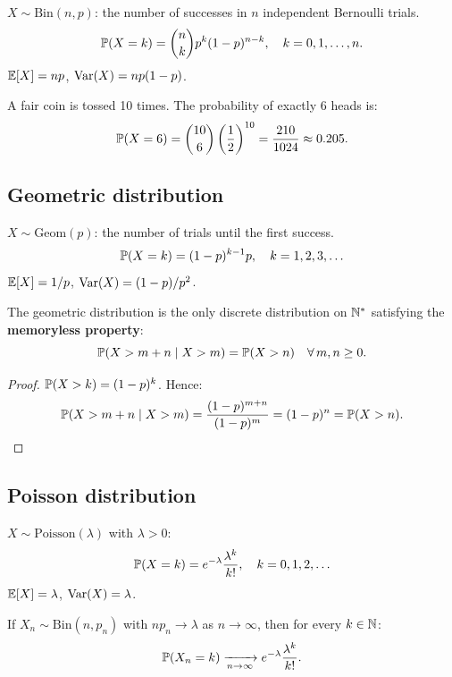 \begin{definition}[Binomial]
$X \sim \mathrm{Bin}(n, p)$: the number of successes in $n$ independent
Bernoulli trials.
\[
    \mathbb{P}(X = k) = \binom{n}{k} p^k (1-p)^{n-k}, \quad k = 0, 1, \ldots, n.
\]
$\mathbb{E}[X] = np$, $\mathrm{Var}(X) = np(1-p)$.
\end{definition}

\begin{example}
A fair coin is tossed 10 times. The probability of exactly 6 heads is:
\[
    \mathbb{P}(X = 6) = \binom{10}{6}\left(\frac{1}{2}\right)^{10}
    = \frac{210}{1024} \approx 0.205.
\]
\end{example}

\subsection{Geometric distribution}

\begin{definition}[Geometric]
$X \sim \mathrm{Geom}(p)$: the number of trials until the first success.
\[
    \mathbb{P}(X = k) = (1-p)^{k-1} p, \quad k = 1, 2, 3, \ldots
\]
$\mathbb{E}[X] = 1/p$, $\mathrm{Var}(X) = (1-p)/p^2$.
\end{definition}

\begin{proposition}[Memorylessness]
The geometric distribution is the only discrete distribution on $\mathbb{N}^*$ satisfying
the \textbf{memoryless property}:
\[
    \mathbb{P}(X > m + n \mid X > m) = \mathbb{P}(X > n) \quad \forall\, m, n \geq 0.
\]
\end{proposition}

\begin{proof}
$\mathbb{P}(X > k) = (1-p)^k$. Hence:
\[
    \mathbb{P}(X > m+n \mid X > m) = \frac{(1-p)^{m+n}}{(1-p)^m} = (1-p)^n = \mathbb{P}(X > n). \qedhere
\]
\end{proof}

\subsection{Poisson distribution}

\begin{definition}[Poisson]
$X \sim \mathrm{Poisson}(\lambda)$ with $\lambda > 0$:
\[
    \mathbb{P}(X = k) = e^{-\lambda}\frac{\lambda^k}{k!}, \quad k = 0, 1, 2, \ldots
\]
$\mathbb{E}[X] = \lambda$, $\mathrm{Var}(X) = \lambda$.
\end{definition}

\begin{theorem}
If $X_n \sim \mathrm{Bin}(n, p_n)$ with $np_n \to \lambda$ as $n \to \infty$,
then for every $k \in \mathbb{N}$:
\[
    \mathbb{P}(X_n = k) \xrightarrow[n \to \infty]{} e^{-\lambda}\frac{\lambda^k}{k!}.
\]
\end{theorem}

